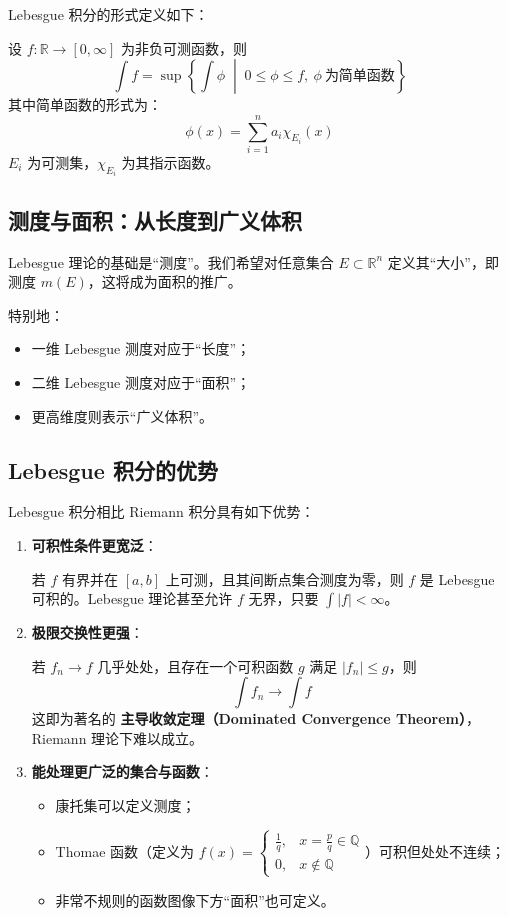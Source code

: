 \documentclass[a4paper, oneside]{article}
\begin{document}
Lebesgue 积分的形式定义如下：

设 $f: \mathbb{R} \to [0, \infty]$ 为非负可测函数，则
\[
\int f = \sup\left\{ \int \phi \;\middle|\; 0 \leq \phi \leq f,\ \phi\ \text{为简单函数} \right\}
\]
其中简单函数的形式为：
\[
\phi(x) = \sum_{i=1}^n a_i \chi_{E_i}(x)
\]
$E_i$ 为可测集，$\chi_{E_i}$ 为其指示函数。

\subsection{测度与面积：从长度到广义体积}

Lebesgue 理论的基础是“测度”。我们希望对任意集合 $E \subset \mathbb{R}^n$ 定义其“大小”，即测度 $m(E)$，这将成为面积的推广。

特别地：
\begin{itemize}
    \item 一维 Lebesgue 测度对应于“长度”；
    \item 二维 Lebesgue 测度对应于“面积”；
    \item 更高维度则表示“广义体积”。
\end{itemize}

\subsection{Lebesgue 积分的优势}

Lebesgue 积分相比 Riemann 积分具有如下优势：

\begin{enumerate}
    \item \textbf{可积性条件更宽泛}：

    若 $f$ 有界并在 $[a,b]$ 上可测，且其间断点集合测度为零，则 $f$ 是 Lebesgue 可积的。Lebesgue 理论甚至允许 $f$ 无界，只要 $\int |f| < \infty$。

    \item \textbf{极限交换性更强}：

    若 $f_n \to f$ 几乎处处，且存在一个可积函数 $g$ 满足 $|f_n| \leq g$，则
    \[
    \int f_n \to \int f
    \]
    这即为著名的 \textbf{主导收敛定理（Dominated Convergence Theorem）}，Riemann 理论下难以成立。

    \item \textbf{能处理更广泛的集合与函数}：

    \begin{itemize}
        \item 康托集可以定义测度；
        \item Thomae 函数（定义为 $f(x) = \begin{cases} \frac{1}{q}, & x = \frac{p}{q} \in \mathbb{Q} \\ 0, & x \notin \mathbb{Q} \end{cases}$）可积但处处不连续；
        \item 非常不规则的函数图像下方“面积”也可定义。
    \end{itemize}
\end{enumerate}
\end{document}
